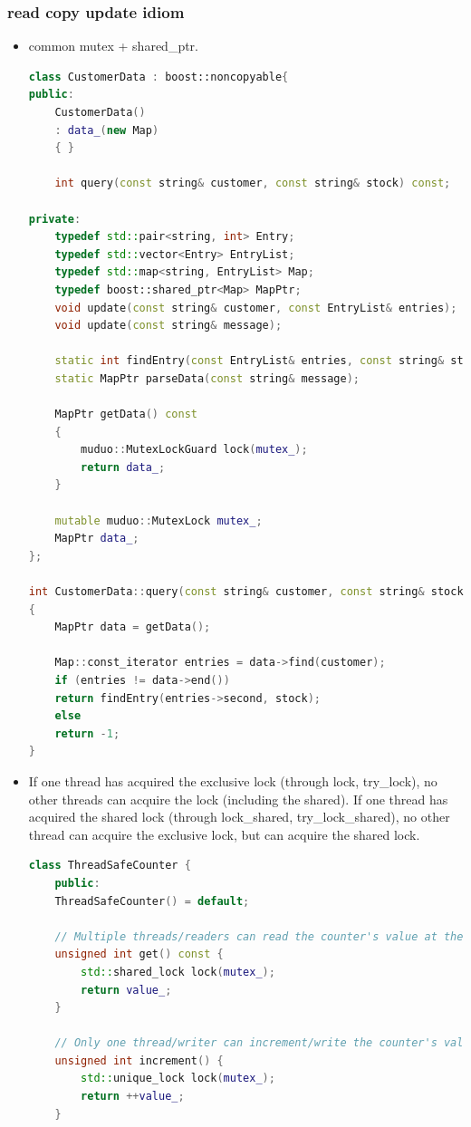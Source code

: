 \documentclass[a4paper,11pt,twoside]{book}
\begin{document}
\subsubsection{read copy update idiom}

\begin{itemize}

\item common mutex + shared\_ptr.
\begin{lstlisting}[frame=single, language=c++]	
class CustomerData : boost::noncopyable{
public:
	CustomerData()
	: data_(new Map)
	{ }
	
	int query(const string& customer, const string& stock) const;
	
private:
	typedef std::pair<string, int> Entry;
	typedef std::vector<Entry> EntryList;
	typedef std::map<string, EntryList> Map;
	typedef boost::shared_ptr<Map> MapPtr;
	void update(const string& customer, const EntryList& entries);
	void update(const string& message);
	
	static int findEntry(const EntryList& entries, const string& stock);
	static MapPtr parseData(const string& message);
	
	MapPtr getData() const
	{
		muduo::MutexLockGuard lock(mutex_);
		return data_;
	}
	
	mutable muduo::MutexLock mutex_;
	MapPtr data_;
};

int CustomerData::query(const string& customer, const string& stock) const
{
	MapPtr data = getData();
	
	Map::const_iterator entries = data->find(customer);
	if (entries != data->end())
	return findEntry(entries->second, stock);
	else
	return -1;
}
\end{lstlisting}


\item If one thread has acquired the exclusive lock (through lock, try\_lock), no other threads can acquire the lock (including the shared). If one thread has acquired the shared lock (through lock\_shared, try\_lock\_shared), no other thread can acquire the exclusive lock, but can acquire the shared lock.
\begin{lstlisting}[frame=single, language=c++]	
class ThreadSafeCounter {
	public:
	ThreadSafeCounter() = default;
	
	// Multiple threads/readers can read the counter's value at the same time.
	unsigned int get() const {
		std::shared_lock lock(mutex_);
		return value_;
	}
	
	// Only one thread/writer can increment/write the counter's value.
	unsigned int increment() {
		std::unique_lock lock(mutex_);
		return ++value_;
	}
	

\end{lstlisting}
\end{itemize}
\end{document}
